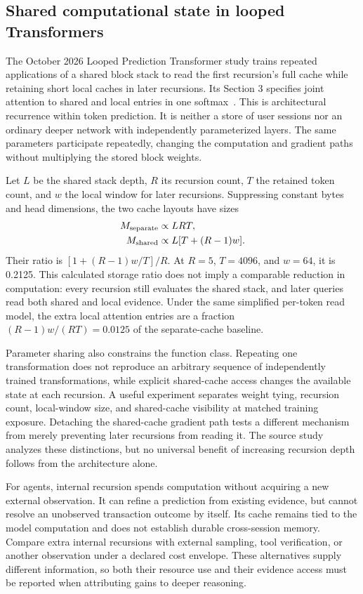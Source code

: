 \subsection{Shared computational state in looped Transformers}
\label{sec:C03:looped}
The October 2026 Looped Prediction Transformer study trains repeated applications of a shared block stack to read the first recursion's full cache while retaining short local caches in later recursions. Its Section 3 specifies joint attention to shared and local entries in one softmax~\cite{rewrite_looped2026}. This is architectural recurrence within token prediction. It is neither a store of user sessions nor an ordinary deeper network with independently parameterized layers. The same parameters participate repeatedly, changing the computation and gradient paths without multiplying the stored block weights.

Let $L$ be the shared stack depth, $R$ its recursion count, $T$ the retained token count, and $w$ the local window for later recursions. Suppressing constant bytes and head dimensions, the two cache layouts have sizes
\begin{align}
 M_{\rm separate}&\propto LRT,\\
 M_{\rm shared}&\propto L[T+(R-1)w].
\end{align}
Their ratio is $[1+(R-1)w/T]/R$. At $R=5$, $T=4096$, and $w=64$, it is 0.2125. This calculated storage ratio does not imply a comparable reduction in computation: every recursion still evaluates the shared stack, and later queries read both shared and local evidence. Under the same simplified per-token read model, the extra local attention entries are a fraction $(R-1)w/(RT)=0.0125$ of the separate-cache baseline.

Parameter sharing also constrains the function class. Repeating one transformation does not reproduce an arbitrary sequence of independently trained transformations, while explicit shared-cache access changes the available state at each recursion. A useful experiment separates weight tying, recursion count, local-window size, and shared-cache visibility at matched training exposure. Detaching the shared-cache gradient path tests a different mechanism from merely preventing later recursions from reading it. The source study analyzes these distinctions, but no universal benefit of increasing recursion depth follows from the architecture alone.

For agents, internal recursion spends computation without acquiring a new external observation. It can refine a prediction from existing evidence, but cannot resolve an unobserved transaction outcome by itself. Its cache remains tied to the model computation and does not establish durable cross-session memory. Compare extra internal recursions with external sampling, tool verification, or another observation under a declared cost envelope. These alternatives supply different information, so both their resource use and their evidence access must be reported when attributing gains to deeper reasoning.



